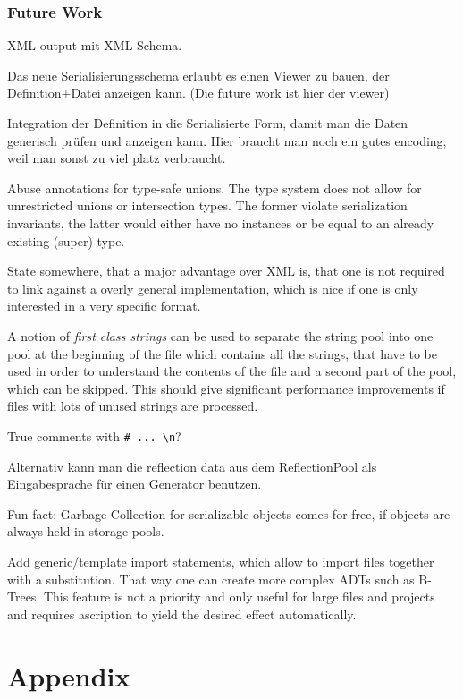 \documentclass[a4paper,10pt]{article}
\begin{document}

\section{Future Work}

XML output mit XML Schema.

Das neue Serialisierungsschema erlaubt es einen Viewer zu bauen, der Definition+Datei anzeigen kann. (Die future work ist hier der viewer)

Integration der Definition in die Serialisierte Form, damit man die Daten generisch prüfen und anzeigen kann. Hier braucht man noch ein gutes encoding, weil man sonst zu viel platz verbraucht.

Abuse annotations for type-safe unions. The type system does not allow for unrestricted unions or intersection types. The former violate serialization invariants, the latter would either have no instances or be equal to an already existing (super) type.

State somewhere, that a major advantage over XML is, that one is not required to link against a overly general implementation, which is nice if one is only interested in a very specific format.

A notion of \textit{first class strings} can be used to separate the string pool into one pool at the beginning of the file which contains all the strings, that have to be used in order to understand the contents of the file and a second part of the pool, which can be skipped. This should give significant performance improvements if files with lots of unused strings are processed.

True comments with \verb/# ... \n/?

Alternativ kann man die reflection data aus dem ReflectionPool als Eingabesprache für einen Generator benutzen.

Fun fact: Garbage Collection for serializable objects comes for free, if objects are always held in storage pools.

Add generic/template import statements, which allow to import files together with a substitution. That way one can create more complex ADTs such as B-Trees. This feature is not a priority and only useful for large files and projects and requires ascription to yield the desired effect automatically.

\newpage
\todos

\part{Appendix}
\renewcommand\thesection{\Alph{section}}
\setcounter{section}{0}





\newpage
\glsaddall
\printglossaries
\end{document}
